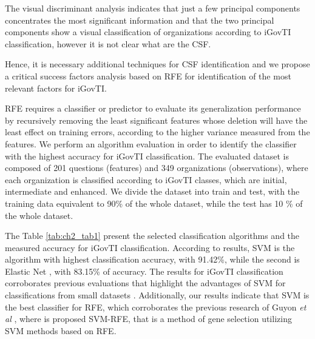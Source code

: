 The visual discriminant analysis indicates that just a few principal components concentrates the most significant information and that the two principal components show a visual classification of organizations according to iGovTI classification, however it is not clear what are the CSF. 

Hence, it is necessary additional techniques for CSF identification and we propose a critical success factors analysis based on RFE for identification of the most relevant factors for iGovTI.

RFE requires a classifier or predictor to evaluate its generalization performance by recursively removing the least significant features whose deletion will have the least effect on training errors, according to the higher variance measured from the features. We perform an algorithm evaluation in order to identify the classifier with the highest accuracy for iGovTI classification. The evaluated dataset is composed of 201 questions (features) and 349 organizations (observations), where each organization is classified according to iGovTI classes, which are initial, intermediate and enhanced. We divide the dataset into train and test, with the training data equivalent to 90\% of the whole dataset, while the test has 10 \% of the whole dataset.

The Table \ref{tab:ch2_tab1} present the selected classification algorithms and the measured accuracy for iGovTI classification. According to results, SVM \cite{hearst1998support} is the algorithm with highest classification accuracy, with 91.42\%, while the second is Elastic Net \cite{zou2005regularization}, with 83.15\% of accuracy. The results for iGovTI classification corroborates previous evaluations that highlight the advantages of SVM for classifications from small datasets \cite{guyon2002gene}. Additionally, our results indicate that SVM is the best classifier for RFE, which corroborates the previous research of Guyon \emph{et al} \cite{guyon2002gene}, where is proposed SVM-RFE, that is a method of gene selection utilizing SVM methods based on RFE. 	

